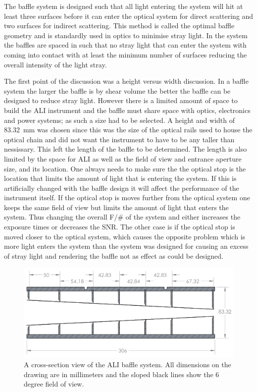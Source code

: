 The baffle system is designed such that all light entering the system will hit at least three surfaces before it can enter the optical system for direct scattering and two surfaces for indirect scattering. This method is called the optimal baffle geometry and is standardly used in optics to minimise stray light. In the system the baffles are spaced in such that no stray light that can enter the system with coming into contact with at least the minimum number of surfaces reducing the overall intensity of the light stray.

The first point of the discussion was a height versus width discussion. In a baffle system the larger the baffle is by shear volume the better the baffle can be designed to reduce stray light. However there is a limited amount of space to build the ALI instrument and the baffle must share space with optics, electronics and power systems; as such a size had to be selected. A height and width of 83.32~mm was chosen since this was the size of the optical rails used to house the optical chain and did not want the instrument to have to be any taller than nessissary. This left the length of the baffle to be determined. The length is also limited by the space for ALI as well as the field of view and entrance aperture size, and its location. One always needs to make sure the the optical stop is the location that limits the amount of light that is entering the system. If this is artificially changed with the baffle design it will affect the performance of the instrument itself. If the optical stop is moves further from the optical system one keeps the same field of view but limits the amount of light that enters the system. Thus changing the overall F/\# of the system and either increases the exposure times or decreases the SNR. The other case is if the optical stop is moved closer to the optical system, which causes the opposite problem which is more light enters the system than the system was designed for causing an excess of stray light and rendering the baffle not as effect as could be designed.

\begin{figure}[h!]
        \includegraphics[width=1.0\textwidth]{./Images/3-3-BaffleAssembly.png}
        \caption[ALI Baffle Cross Section]{A cross-section view of the ALI baffle system. All dimensions on the drawing are
        in millimeters and the sloped black lines show the 6 degree field of view.}
        \label{fig:3.3:aliBaffleCrossSection}
\end{figure}


